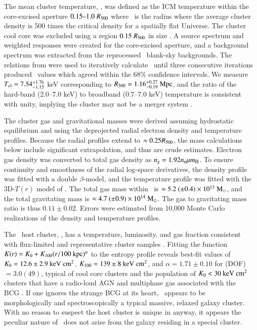 \documentclass[referee,traditabstract]{aa}
\begin{document}
The mean cluster temperature, \cltx, was defined as the ICM
temperature within the core-excised aperture $0.15 \mbox{--} 1.0~R_{\rm{500}}$
where \rf\ is the radius where the average cluster density is 500
times the critical density for a spatially flat Universe. The cluster
cool core was excluded using a region $0.15 ~R_{\rm{500}}$ in size
\citep{2007ApJ...668..772M}. A source spectrum and weighted responses
were created for the core-excised aperture, and a background spectrum
was extracted from the reprocessed \caldb\ blank-sky backgrounds. The
relations from \cite{2002A&A...389....1A} were used to iteratively
calculate \rf\ until three consecutive iterations produced
\cltx\ values which agreed within the 68\% confidence intervals. We
measure $T_{\rm{cl}} = 7.54^{+1.76}_{-1.15}$ keV corresponding to $R_{\rm{500}} =
1.16^{+0.27}_{-0.19}~\mbox{\ensuremath{\rm{Mpc}}}$, and the ratio of the hard-band (2.0--7.0
keV) to broadband (0.7--7.0 keV) temperature is consistent with unity,
implying the cluster may not be a merger system
\citep[\eg][]{xrayband}.

The cluster gas and gravitational masses were derived assuming
hydrostatic equilibrium and using the deprojected radial electron
density and temperature profiles. Because the radial profiles extend
to $\approx 0.25 R_{\rm{500}}$, the mass calculations below include significant
extrapolation, and thus are crude estimates. Electron gas density was
converted to total gas density as $n_g = 1.92 n_{\rm{e}} \mu m_{\rm{H}}$. To
ensure continuity and smoothness of the radial log-space derivatives,
the density profile was fitted with a double $\beta$-model, and the
temperature profile was fitted with the 3D-$T(r)$ model of
\citet{2006ApJ...640..691V}. The total gas mass within \rf\ is
$\approx 5.2 ~(\pm 0.4) \times 10^{13} ~\rm{M_{\odot}}$, and the total
gravitating mass is $\approx 4.7 ~(\pm 0.9) \times 10^{14}
~\rm{M_{\odot}}$. The gas to gravitating mass ratio is thus $0.11 \pm
0.02$. Errors were estimated from 10,000 Monte Carlo realizations of
the density and temperature profiles.

The \irs\ host cluster, \rxj, has a temperature, luminosity, and gas
fraction consistent with flux-limited and representative cluster
samples \citep{hiflugcs2, 2009A&A...498..361P}. Fitting the function
$K(r) = K_0 +K_{100} (r/100 ~\mbox{\ensuremath{\rm{kpc}}})^{\alpha}$ to the entropy profile
reveals best-fit values of $K_0 = 12.6 \pm 2.9 ~\rm{\mbox{\ensuremath{\rm{keV}}}~\ensuremath{\rm{\mbox{\ensuremath{\rm{cm}}}^2}}}$, $K_{100} = 139
\pm 8 ~\rm{\mbox{\ensuremath{\rm{keV}}}~\ensuremath{\rm{\mbox{\ensuremath{\rm{cm}}}^2}}}$, and $\alpha = 1.71 \pm 0.10$ for \chisq(DOF)$ =
3.0(49)$, typical of cool core clusters and the population of $K_0 <
30 ~\rm{\mbox{\ensuremath{\rm{keV}}}~\ensuremath{\rm{\mbox{\ensuremath{\rm{cm}}}^2}}}$ clusters that have a radio-loud AGN and multiphase gas
associated with the BCG \citep{haradent, rafferty08, accept,
  2009MNRAS.395..764S}. If one ignores the strange BCG at its heart,
\rxj\ appears to be morphologically and spectroscopically a typical
massive, relaxed galaxy cluster. With no reason to suspect the host
cluster is unique in anyway, it appears the peculiar nature of
\irs\ does not arise from the galaxy residing in a special cluster.
\end{document}
